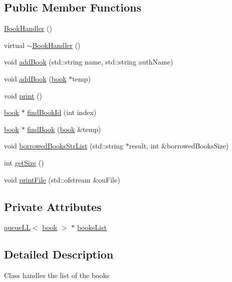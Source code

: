 \subsection*{Public Member Functions}
\begin{DoxyCompactItemize}
\item 
\hyperlink{class_book_handler_a73362998148ff419f5dccd629f858832}{Book\+Handler} ()
\item 
virtual \hyperlink{class_book_handler_afd60e561a18f17d087da3c8b04d0c842}{$\sim$\+Book\+Handler} ()
\item 
void \hyperlink{class_book_handler_a29517e8c55796a94f29c48d6971e9f1d}{add\+Book} (std\+::string name, std\+::string auth\+Name)
\item 
void \hyperlink{class_book_handler_aac102920daa87a20f3e169f9c3cbc33b}{add\+Book} (\hyperlink{classbook}{book} $\ast$temp)
\item 
void \hyperlink{class_book_handler_ac6e2d4211b55e636348daaa9253a2d12}{print} ()
\item 
\hyperlink{classbook}{book} $\ast$ \hyperlink{class_book_handler_ae82abc7349e19e59cd6f3cb23c7928fa}{find\+Book\+Id} (int index)
\item 
\hyperlink{classbook}{book} $\ast$ \hyperlink{class_book_handler_aab461b060b38d51586ed043143b4bc68}{find\+Book} (\hyperlink{classbook}{book} \&temp)
\item 
void \hyperlink{class_book_handler_ac0274027fa9375870ffb08fbb6377a7d}{borrowed\+Books\+Str\+List} (std\+::string $\ast$result, int \&borrowed\+Books\+Size)
\item 
int \hyperlink{class_book_handler_a2939194b5d19618d5a69743b4c0dc240}{get\+Size} ()
\item 
void \hyperlink{class_book_handler_a6794f0f693ff3048df64a5b254c183af}{print\+File} (std\+::ofstream \&ou\+File)
\end{DoxyCompactItemize}
\subsection*{Private Attributes}
\begin{DoxyCompactItemize}
\item 
\hyperlink{classqueue_l_l}{queue\+LL}$<$ \hyperlink{classbook}{book} $>$ $\ast$ \hyperlink{class_book_handler_a13a6c78422b3ad7acd5ebdb9555a0286}{books\+List}
\end{DoxyCompactItemize}


\subsection{Detailed Description}
Class handles the list of the books 

